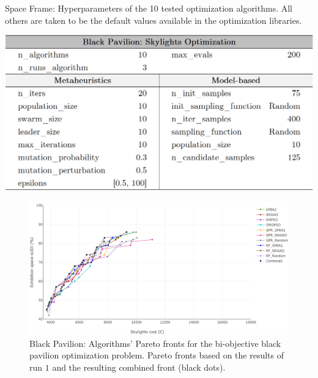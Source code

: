 \begin{table}[h!]
	\centering
	\label{table:configurationsspaceframe}
	\caption[Black Pavilion: Hyperparameters of the tested optimization optimization algorithms]{Space Frame: Hyperparameters of the 10 tested optimization algorithms. All others are taken to be the default values available in the optimization libraries.}
	\includegraphics[width=\textwidth]{tables_and_code/appendices/configs_black_pavilion.PNG}
\end{table}


\begin{figure}[h!]
	\centering
	\includegraphics[width=\textwidth]{Images/Evaluation/BlackPavilion/All_Algorithms_run1-2019-04-19.png}
	\caption[Black Pavilion: Pareto Fronts for run 1]{Black Pavilion: Algorithms' Pareto fronts for the bi-objective black pavilion optimization problem. Pareto fronts based on the results of run $1$ and the resulting combined front (black dots).}
	\label{table:blackpavilionrun1}
\end{figure}

